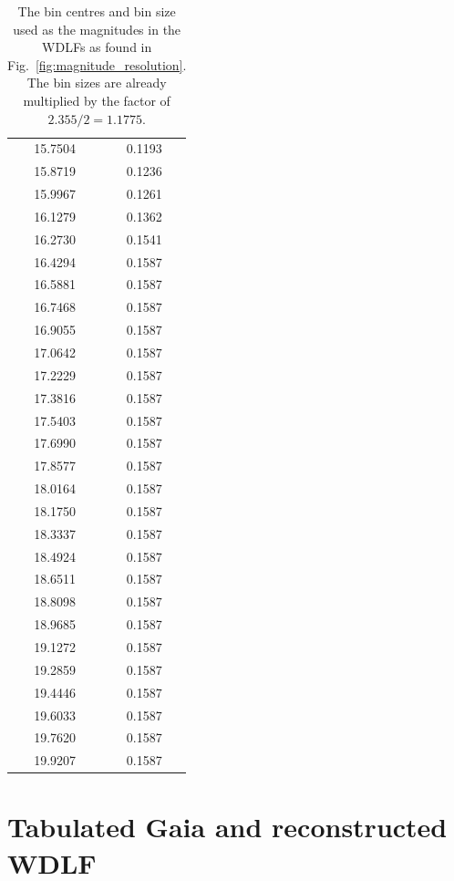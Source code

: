 \documentclass[fleqn,usenatbib]{mnras}
\begin{document}
\begin{table}
\begin{tabular}{c|c}
        15.7504 & 0.1193\\
        15.8719 & 0.1236\\
        15.9967 & 0.1261\\
        16.1279 & 0.1362\\
        16.2730 & 0.1541\\
        16.4294 & 0.1587\\
        16.5881 & 0.1587\\
        16.7468 & 0.1587\\\hline
        16.9055 & 0.1587\\
        17.0642 & 0.1587\\
        17.2229 & 0.1587\\
        17.3816 & 0.1587\\
        17.5403 & 0.1587\\
        17.6990 & 0.1587\\
        17.8577 & 0.1587\\
        18.0164 & 0.1587\\
        18.1750 & 0.1587\\
        18.3337 & 0.1587\\\hline
        18.4924 & 0.1587\\
        18.6511 & 0.1587\\
        18.8098 & 0.1587\\
        18.9685 & 0.1587\\
        19.1272 & 0.1587\\
        19.2859 & 0.1587\\
        19.4446 & 0.1587\\
        19.6033 & 0.1587\\
        19.7620 & 0.1587\\
        19.9207 & 0.1587\\\hline
            \end{tabular}
    \caption{The bin centres and bin size used as the magnitudes in the WDLFs
    as found in Fig.~\ref{fig:magnitude_resolution}. The bin sizes are already 
    multiplied by the factor of $2.355 /2 = 1.1775$.}
    \label{tab:magnitude_resolution}
\end{table}

\section{Tabulated Gaia and reconstructed WDLF}
\label{appexdix:reconstructed-wdlf}
\end{document}
